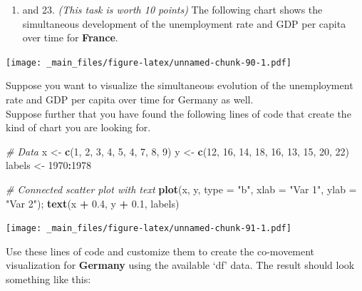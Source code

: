 \documentclass[
  12pt,
  oneside]{book}
\newenvironment{Shaded}{\begin{snugshade}}{\end{snugshade}}
\newcommand{\AttributeTok}[1]{\textcolor[rgb]{0.13,0.29,0.53}{#1}}
\newcommand{\CommentTok}[1]{\textcolor[rgb]{0.56,0.35,0.01}{\textit{#1}}}
\newcommand{\DecValTok}[1]{\textcolor[rgb]{0.00,0.00,0.81}{#1}}
\newcommand{\FloatTok}[1]{\textcolor[rgb]{0.00,0.00,0.81}{#1}}
\newcommand{\FunctionTok}[1]{\textcolor[rgb]{0.13,0.29,0.53}{\textbf{#1}}}
\newcommand{\NormalTok}[1]{#1}
\newcommand{\OtherTok}[1]{\textcolor[rgb]{0.56,0.35,0.01}{#1}}
\newcommand{\SpecialCharTok}[1]{\textcolor[rgb]{0.81,0.36,0.00}{\textbf{#1}}}
\newcommand{\StringTok}[1]{\textcolor[rgb]{0.31,0.60,0.02}{#1}}
\providecommand{\tightlist}{%
  \setlength{\itemsep}{0pt}\setlength{\parskip}{0pt}}
\begin{document}
\begin{enumerate}
\def\labelenumi{(\arabic{enumi})}
\setcounter{enumi}{21}
\tightlist
\item
  and 23. \emph{(This task is worth 10 points)}
  The following chart shows the simultaneous development of the unemployment rate and GDP per capita over time for \textbf{France}.
\end{enumerate}

\texttt{[image: \_main\_files/figure-latex/unnamed-chunk-90-1.pdf]}

Suppose you want to visualize the simultaneous evolution of the unemployment rate and GDP per capita over time for Germany as well.\\
Suppose further that you have found the following lines of code that create the kind of chart you are looking for.

\begin{Shaded}
\begin{Highlighting}[]
\CommentTok{\# Data}
\NormalTok{x }\OtherTok{\textless{}{-}} \FunctionTok{c}\NormalTok{(}\DecValTok{1}\NormalTok{, }\DecValTok{2}\NormalTok{, }\DecValTok{3}\NormalTok{, }\DecValTok{4}\NormalTok{, }\DecValTok{5}\NormalTok{, }\DecValTok{4}\NormalTok{, }\DecValTok{7}\NormalTok{, }\DecValTok{8}\NormalTok{, }\DecValTok{9}\NormalTok{)}
\NormalTok{y }\OtherTok{\textless{}{-}} \FunctionTok{c}\NormalTok{(}\DecValTok{12}\NormalTok{, }\DecValTok{16}\NormalTok{, }\DecValTok{14}\NormalTok{, }\DecValTok{18}\NormalTok{, }\DecValTok{16}\NormalTok{, }\DecValTok{13}\NormalTok{, }\DecValTok{15}\NormalTok{, }\DecValTok{20}\NormalTok{, }\DecValTok{22}\NormalTok{)}
\NormalTok{labels }\OtherTok{\textless{}{-}} \DecValTok{1970}\SpecialCharTok{:}\DecValTok{1978}

\CommentTok{\# Connected scatter plot with text}
\FunctionTok{plot}\NormalTok{(x, y, }\AttributeTok{type =} \StringTok{"b"}\NormalTok{, }\AttributeTok{xlab =} \StringTok{"Var 1"}\NormalTok{, }\AttributeTok{ylab =} \StringTok{"Var 2"}\NormalTok{); }\FunctionTok{text}\NormalTok{(x }\SpecialCharTok{+} \FloatTok{0.4}\NormalTok{, y }\SpecialCharTok{+} \FloatTok{0.1}\NormalTok{, labels) }
\end{Highlighting}
\end{Shaded}

\texttt{[image: \_main\_files/figure-latex/unnamed-chunk-91-1.pdf]}

Use these lines of code and customize them to create the co-movement visualization for \textbf{Germany} using the available `df' data.
The result should look something like this:
\end{document}
